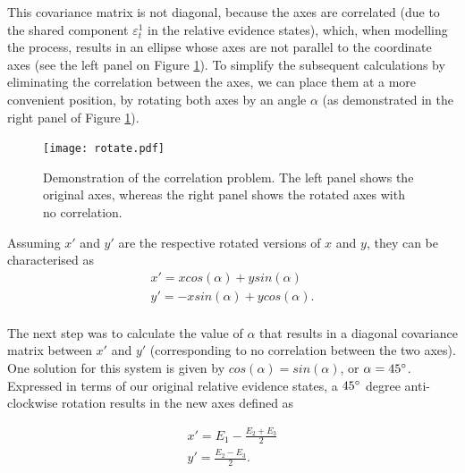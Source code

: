 \documentclass[11pt,a4paper]{article}
\begin{document}
This covariance matrix is not diagonal, because the axes are correlated (due to the shared component $\varepsilon_{t}^{1}$ in the relative evidence states), which, when modelling the process, results in an ellipse whose axes are not parallel to the coordinate axes (see the left panel on Figure \ref{fig:rotate}). To simplify the subsequent calculations by eliminating the correlation between the axes, we can place them at a more convenient position, by rotating both axes by an angle $\alpha$ (as demonstrated in the right panel of Figure \ref{fig:rotate}). 

\begin{figure}[htb!]
\captionsetup{justification=centering}
\centering
\caption{Demonstration of the correlation problem. The left panel shows the original axes, whereas the right panel shows the rotated axes with no correlation.}
\texttt{[image: rotate.pdf]}
\label{fig:rotate}
\end{figure}
 

Assuming $x'$ and $y'$ are the respective rotated versions of $x$ and $y$, they can be characterised as
\begin{equation}
\begin{array}{l}
\displaystyle x' = x cos(\alpha) + y sin(\alpha)\\
\displaystyle y' = -x sin(\alpha) + y cos(\alpha).\\
\end{array} 
\label{eq:axes2}
\end{equation}

The next step was to calculate the value of $\alpha$ that results in a diagonal covariance matrix between $x'$ and $y'$ (corresponding to no correlation between the two axes). One solution for this system is given by $cos(\alpha) = sin(\alpha)$, or $\alpha = 45\degree$. Expressed in terms of our original relative evidence states, a $45\degree$ degree anti-clockwise rotation results in the new axes defined as

\begin{equation}
\begin{array}{l}
\displaystyle x' = E_{1}-\frac{E_{2}+E_{3}}{2}\\
\displaystyle y' = \frac{E_{2}-E_{3}}{2}.\\
\end{array} 
\label{eq:axes1}
\end{equation}
 
\end{document}
